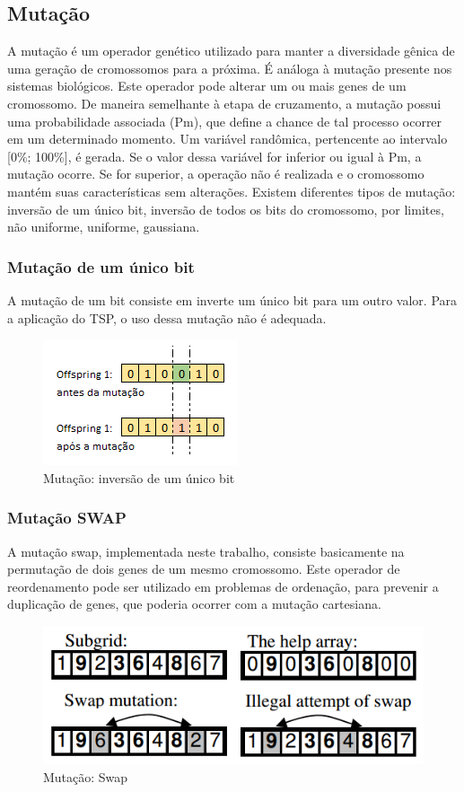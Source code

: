 \documentclass[twoside]{article}
\begin{document}
\begin{multicols}{2}
\subsection{Mutação}
A mutação é um operador genético utilizado para manter a diversidade gênica de uma geração de cromossomos para a próxima. É análoga à mutação presente nos sistemas biológicos. Este operador pode alterar um ou mais genes de um cromossomo. De maneira semelhante à etapa de cruzamento, a mutação possui uma probabilidade associada (Pm), que define a chance de tal processo ocorrer em um determinado momento. Um variável randômica, pertencente ao intervalo [0\%; 100\%], é gerada. Se o valor dessa variável for inferior ou igual à Pm, a mutação ocorre. Se for superior, a operação não é realizada e o cromossomo mantém suas características sem alterações. Existem diferentes tipos de mutação: inversão de um único bit, inversão de todos os bits do cromossomo, por limites, não uniforme, uniforme, gaussiana.

\subsubsection{Mutação de um único bit}
A mutação de um bit consiste em inverte um único bit para um outro valor. Para a aplicação do TSP, o uso dessa mutação não é adequada.

\begin{figure}[H]
\label{fig:mut}
  \caption{Mutação: inversão de um único bit}
  \centering
    \includegraphics[scale = 0.9]{mutation.png}
\end{figure}

\subsubsection{Mutação SWAP}
A mutação swap, implementada neste trabalho, consiste basicamente na permutação de dois genes de um mesmo cromossomo. Este operador de reordenamento pode ser utilizado em problemas de ordenação, para prevenir a duplicação de genes, que poderia ocorrer com a mutação cartesiana.

\begin{figure}[H]
\label{fig:mut}
  \caption{Mutação: Swap}
  \centering
    \includegraphics[scale = 0.5]{mutation_swap.png}
\end{figure}


\end{multicols}
\end{document}
